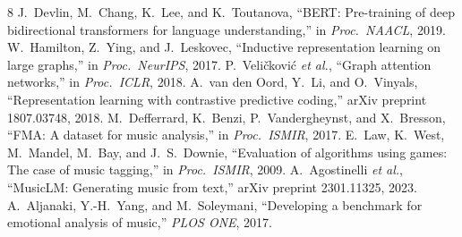 \documentclass[conference]{IEEEtran}
\begin{document}
\begin{thebibliography}{8}
 J.~Devlin, M.~Chang, K.~Lee, and K.~Toutanova, ``BERT: Pre-training of deep bidirectional transformers for language understanding,'' in \emph{Proc.\ NAACL}, 2019.
 W.~Hamilton, Z.~Ying, and J.~Leskovec, ``Inductive representation learning on large graphs,'' in \emph{Proc.\ NeurIPS}, 2017.
 P.~Veli{\v{c}}kovi{\'c} \emph{et al.}, ``Graph attention networks,'' in \emph{Proc.\ ICLR}, 2018.
 A.~van den Oord, Y.~Li, and O.~Vinyals, ``Representation learning with contrastive predictive coding,'' arXiv preprint 1807.03748, 2018.
 M.~Defferrard, K.~Benzi, P.~Vandergheynst, and X.~Bresson, ``FMA: A dataset for music analysis,'' in \emph{Proc.\ ISMIR}, 2017.
 E.~Law, K.~West, M.~Mandel, M.~Bay, and J.~S.~Downie, ``Evaluation of algorithms using games: The case of music tagging,'' in \emph{Proc.\ ISMIR}, 2009.
 A.~Agostinelli \emph{et al.}, ``MusicLM: Generating music from text,'' arXiv preprint 2301.11325, 2023.
 A.~Aljanaki, Y.-H.~Yang, and M.~Soleymani, ``Developing a benchmark for emotional analysis of music,'' \emph{PLOS ONE}, 2017.
\end{thebibliography}
\end{document}
